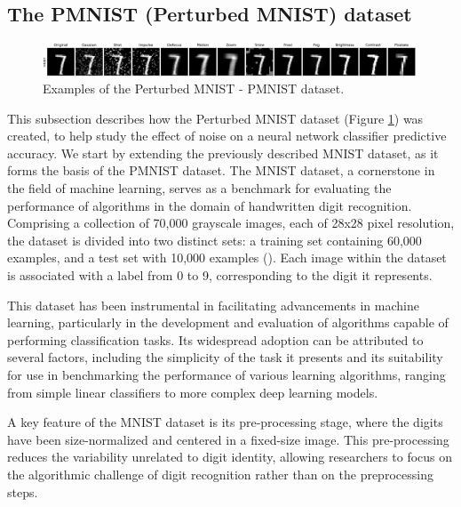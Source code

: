 \subsection{The PMNIST (Perturbed MNIST) dataset}

\begin{figure}[h]
\centering
\includegraphics[width=0.99\textwidth]{Figures/Methods/MNIST_Perturbations.png}
\caption{Examples of the Perturbed MNIST - PMNIST dataset.}
\label{fig:MNIST_Perturbations}
\end{figure}

This subsection describes how the Perturbed MNIST dataset (Figure \ref{fig:MNIST_Perturbations}) was created, to help study the effect of noise on a neural network classifier predictive accuracy. We start by extending the previously described MNIST dataset, as it forms the basis of the PMNIST dataset.
The MNIST dataset, a cornerstone in the field of machine learning, serves as a benchmark for evaluating the performance of algorithms in the domain of handwritten digit recognition. Comprising a collection of 70,000 grayscale images, each of 28x28 pixel resolution, the dataset is divided into two distinct sets: a training set containing 60,000 examples, and a test set with 10,000 examples (\cite{lecun1998gradient}). Each image within the dataset is associated with a label from 0 to 9, corresponding to the digit it represents.

This dataset has been instrumental in facilitating advancements in machine learning, particularly in the development and evaluation of algorithms capable of performing classification tasks. Its widespread adoption can be attributed to several factors, including the simplicity of the task it presents and its suitability for use in benchmarking the performance of various learning algorithms, ranging from simple linear classifiers to more complex deep learning models.

A key feature of the MNIST dataset is its pre-processing stage, where the digits have been size-normalized and centered in a fixed-size image. This pre-processing reduces the variability unrelated to digit identity, allowing researchers to focus on the algorithmic challenge of digit recognition rather than on the preprocessing steps.


